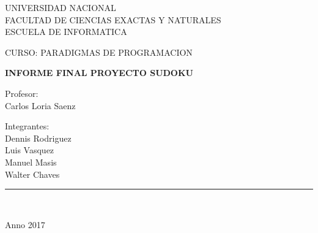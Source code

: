\documentclass[a4paper,openright,12pt]{report}
\begin{document}
\begin{titlepage}

\begin{center}
\vspace*{-1in}
\begin{figure}[htb]
\begin{center}
\end{center}
\end{figure}
UNIVERSIDAD NACIONAL\\
\vspace*{0.15in}
FACULTAD DE CIENCIAS EXACTAS Y NATURALES\\
\vspace*{0.15in}
ESCUELA DE INFORMATICA \\
\vspace*{0.6in}
\begin{Large}
CURSO: PARADIGMAS DE PROGRAMACION\\
\end{Large}
\vspace*{0.2in}
\begin{Large}
\textbf{INFORME FINAL PROYECTO SUDOKU} \\
\end{Large}
\vspace*{0.5in}
\begin{large}
Profesor:\\
Carlos Loria Saenz\\
\end{large}
\vspace*{0.3in}
\begin{large}
Integrantes:\\
Dennis Rodriguez\\
Luis Vasquez\\
Manuel Masis\\
Walter Chaves\\
\end{large}
\vspace*{0.3in}
\rule{80mm}{0.1mm}\\
\vspace*{0.1in}
\begin{large}
Anno 2017\\
\end{large}
\end{center}

\end{titlepage}
\end{document}
